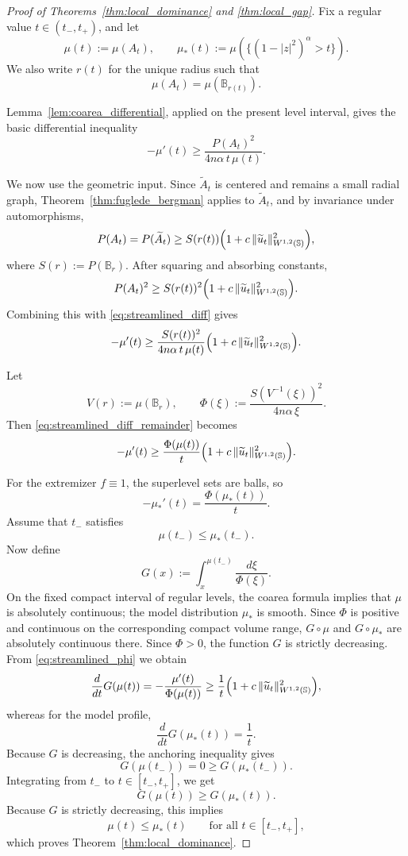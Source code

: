 \documentclass[11pt]{amsart}
\theoremstyle{plain}
\theoremstyle{definition}
\theoremstyle{remark}
\newcommand{\Sph}{\mathbb{S}}
\begin{document}
\begin{proof}[Proof of Theorems~\ref{thm:local_dominance} and \ref{thm:local_gap}]
Fix a regular value \(t\in(t_-,t_+)\), and let
\[
\mu(t):=\mu(A_t),\qquad \mu_*(t):=\mu(\{(1-|z|^2)^\alpha>t\}).
\]
We also write \(r(t)\) for the unique radius such that
\[
\mu(A_t)=\mu(\mathbb B_{r(t)}).
\]

Lemma~\ref{lem:coarea_differential}, applied on the present level interval,
gives the basic differential inequality
\begin{equation}\label{eq:streamlined_diff}
-\mu'(t)\ge \frac{P(A_t)^2}{4n\alpha\,t\,\mu(t)}.
\end{equation}

We now use the geometric input. Since \(\widetilde A_t\) is centered and remains a small radial graph,
Theorem~\ref{thm:fuglede_bergman} applies to \(\widetilde A_t\), and by invariance under automorphisms,
\[
P(A_t)=P(\widetilde A_t)
\ge
S(r(t))\Bigl(1+c\,\|\widetilde u_t\|_{W^{1,2}(\Sph)}^2\Bigr),
\]
where \(S(r):=P(\mathbb B_r)\). After squaring and absorbing constants,
\[
P(A_t)^2
\ge
S(r(t))^2\Bigl(1+c\,\|\widetilde u_t\|_{W^{1,2}(\Sph)}^2\Bigr).
\]
Combining this with \eqref{eq:streamlined_diff} gives
\begin{equation}\label{eq:streamlined_diff_remainder}
-\mu'(t)\ge
\frac{S(r(t))^2}{4n\alpha\,t\,\mu(t)}
\Bigl(1+c\,\|\widetilde u_t\|_{W^{1,2}(\Sph)}^2\Bigr).
\end{equation}

Let
\[
V(r):=\mu(\mathbb B_r),
\qquad
\Phi(\xi):=\frac{S(V^{-1}(\xi))^2}{4n\alpha\,\xi}.
\]
Then \eqref{eq:streamlined_diff_remainder} becomes
\begin{equation}\label{eq:streamlined_phi}
-\mu'(t)\ge \frac{\Phi(\mu(t))}{t}
\Bigl(1+c\,\|\widetilde u_t\|_{W^{1,2}(\Sph)}^2\Bigr).
\end{equation}

For the extremizer \(f\equiv 1\), the superlevel sets are balls, so
\[
-\mu_*'(t)=\frac{\Phi(\mu_*(t))}{t}.
\]
Assume that \(t_-\) satisfies
\[
\mu(t_-)\le\mu_*(t_-).
\]
Now define
\[
G(x):=\int_x^{\mu(t_-)}\frac{d\xi}{\Phi(\xi)}.
\]
On the fixed compact interval of regular levels, the coarea formula implies
that $\mu$ is absolutely continuous; the model distribution $\mu_*$ is smooth.
Since $\Phi$ is positive and continuous on the corresponding compact volume
range, $G\circ\mu$ and $G\circ\mu_*$ are absolutely continuous there. Since
\(\Phi>0\), the function \(G\) is strictly decreasing. From
\eqref{eq:streamlined_phi} we obtain
\[
\frac{d}{dt}G(\mu(t))
=
-\frac{\mu'(t)}{\Phi(\mu(t))}
\ge
\frac1t
\Bigl(1+c\,\|\widetilde u_t\|_{W^{1,2}(\Sph)}^2\Bigr),
\]
whereas for the model profile,
\[
\frac{d}{dt}G(\mu_*(t))=\frac1t.
\]
Because $G$ is decreasing, the anchoring inequality gives
\[
G(\mu(t_-))=0\ge G(\mu_*(t_-)).
\]
Integrating from \(t_-\) to \(t\in[t_-,t_+]\),
we get
\[
G(\mu(t))\ge G(\mu_*(t)).
\]
Because \(G\) is strictly decreasing, this implies
\[
\mu(t)\le \mu_*(t)\qquad\text{for all }t\in[t_-,t_+],
\]
which proves Theorem~\ref{thm:local_dominance}.


\end{proof}
\end{document}
